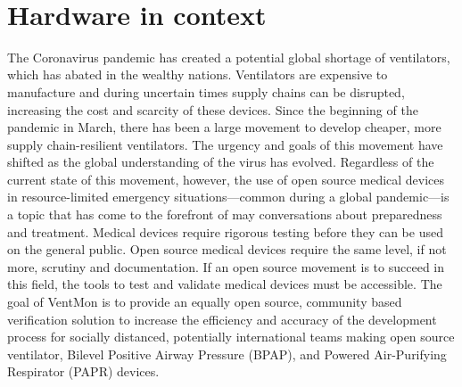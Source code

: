 \documentclass[11pt, letterpaper]{article}
\begin{document}
\begin{flushleft}
\begin{tabu}
\\\hline
\end{tabu}
\end{flushleft}

\section{Hardware in context}
The Coronavirus pandemic has created a potential global shortage of ventilators\cite{pearce2020review}, which has abated in the wealthy nations.
Ventilators are expensive to manufacture and during uncertain times supply chains can be disrupted, increasing the cost and scarcity of these devices. Since the beginning of the pandemic in March,
there has been a large movement to develop cheaper,
more supply chain-resilient ventilators.
The urgency and goals of this movement have shifted as the global understanding of the virus has evolved. Regardless of the current state of this movement, however, the use of
open source medical devices in resource-limited emergency situations---common during a global pandemic---is a topic that has come to the forefront of may conversations about preparedness and treatment.
Medical devices require rigorous testing before they can be used on the general public.
Open source medical devices require the same level, if not more, scrutiny and documentation. If an open source movement is to succeed in this field, the tools to test and validate medical
devices must be accessible.
The goal of VentMon is to provide an equally open source, community based verification solution to increase the efficiency and accuracy of the development process for socially distanced,
potentially international teams making open source ventilator, Bilevel Positive Airway Pressure (BPAP), and Powered Air-Purifying Respirator (PAPR) devices.
\end{document}
